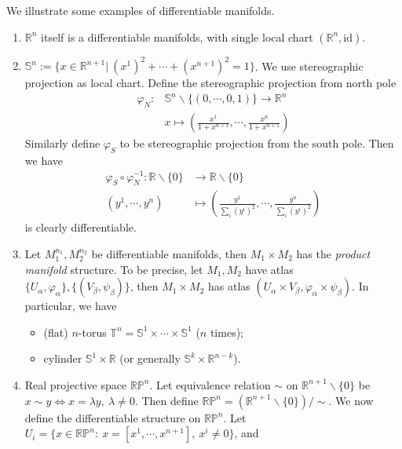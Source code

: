 \begin{eg}We illustrate some examples of differentiable manifolds.
    \begin{enumerate}[(1)]
        \item $\mathbb{R}^n$ itself is a differentiable manifolds, with single local chart $(\mathbb{R}^n,\mathrm{id})$.
        \item $\mathbb{S}^n:=\{x\in\mathbb{R}^{n+1}|\ (x^1)^2+\cdots+(x^{n+1})^2=1\}$.
        We use stereographic projection as local chart. Define the stereographic projection from north pole
        \begin{align*}
            \varphi_N:&\mathbb{S}^n\backslash\{(0,\cdots,0,1)\}\to\mathbb{R}^n\\
            &x\mapsto\left(\frac{x^1}{1+x^{n+1}},\cdots,\frac{x^n}{1+x^{n+1}}\right)
        \end{align*}
        Similarly define $\varphi_S$ to be stereographic projection from the south pole.
        Then we have
        \begin{align*}
            \varphi_S\circ\varphi_N^{-1}:\mathbb{R}\backslash\{0\}&\to\mathbb{R}\backslash\{0\}\\
            (y^1,\cdots,y^n)&\mapsto\left(\frac{y^1}{\sum_i(y^i)^2},\cdots,\frac{y^n}{\sum_i(y^i)^2}\right)
        \end{align*}
        is clearly differentiable.
        \item Let $M_1^{n_1},M_2^{n_2}$ be differentiable manifolds, then $M_1\times M_2$ has the \emph{product manifold} structure.
        To be precise, let $M_1,M_2$ have atlas $\{U_\alpha,\varphi_\alpha\},\{(V_\beta,\psi_\beta)\}$, then $M_1\times M_2$ has atlas $(U_\alpha\times V_\beta,\varphi_\alpha\times\psi_\beta)$.
        In particular, we have
        \begin{itemize}
            \item (flat) $n$-torus $\mathbb{T}^n=\mathbb{S}^1\times\cdots\times\mathbb{S}^1$ ($n$ times);
            \item cylinder $\mathbb{S}^1\times\mathbb{R}$ (or generally $\mathbb{S}^k\times\mathbb{R}^{n-k}$).
        \end{itemize}
        \item Real projective space $\mathbb{RP}^n$.
        Let equivalence relation $\sim$ on $\mathbb{R}^{n+1}\backslash\{0\}$ be $x\sim y\iff x=\lambda y,\ \lambda\neq 0$.
        Then define $\mathbb{RP}^n=(\mathbb{R}^{n+1}\backslash\{0\})/\sim$.
        We now define the differentiable structure on $\mathbb{RP}^n$.
        Let $U_i=\{x\in\mathbb{RP}^n:\ x=[x^1,\cdots,x^{n+1}],\ x^i\neq 0\}$, and

\end{enumerate}
\end{eg}
